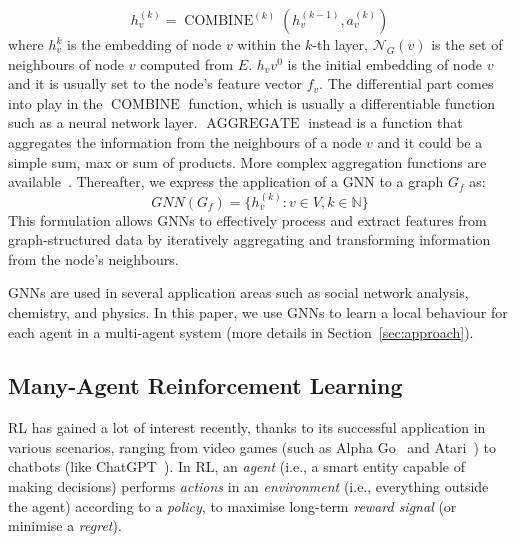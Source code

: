 \documentclass[conference]{IEEEtran}
\begin{document}
\begin{equation}
h_{v}^{(k)}=\operatorname{COMBINE}^{(k)}\left(h_{v}^{(k-1)}, a_{v}^{(k)}\right)
\end{equation}
where $h_{v}^{k}$ is the embedding of node $v$ within the $k$-th layer, 
 $\mathcal{N}_G(v)$ is the set of neighbours of node $v$ computed from $E$.
%
$h_v{v}^0$ is the initial embedding of node $v$ and it is usually set to the node's feature vector $f_v$.
%
The differential part comes into play in the $\operatorname{COMBINE}$ function, 
 which is usually a differentiable function such as a neural network layer.
%
$\operatorname{AGGREGATE} $ instead is a function that aggregates the information from the neighbours of a node $v$
  and it could be a simple sum, max or sum of products. More complex aggregation functions are available~\cite{pellegrini2020learning}.
%
Thereafter, we express the application of a \ac{GNN} to a graph $G_f$ as:
\begin{equation}
    GNN(G_f) = \{h_v^{(k)}: v \in V, k \in \mathbb{N}\}
\end{equation} 
This formulation allows GNNs to effectively process and extract features from graph-structured data by iteratively aggregating and transforming information from the node's neighbours.

\acp{GNN} are used in several application areas such as social network analysis, chemistry, and physics.
In this paper, we use GNNs to learn a local behaviour for each agent in a multi-agent system (more details in Section~\ref{sec:approach}).
\subsection{Many-Agent Reinforcement Learning}

 \Ac{RL} has gained a lot of interest recently, 
 thanks to its successful application in various scenarios, 
 ranging from video games (such as Alpha Go~\cite{Silver2016Go} and Atari~\cite{Atari2016DQN}) 
 to chatbots (like ChatGPT~\cite{ChatGPT2023}). 
% 
In \ac{RL}, an \emph{agent} (i.e., a smart entity capable of making decisions) 
 performs \emph{actions} in an \emph{environment} (i.e., everything outside the agent) according to a \emph{policy}, 
 to maximise long-term \emph{reward signal} (or minimise a \emph{regret}).
\end{document}
